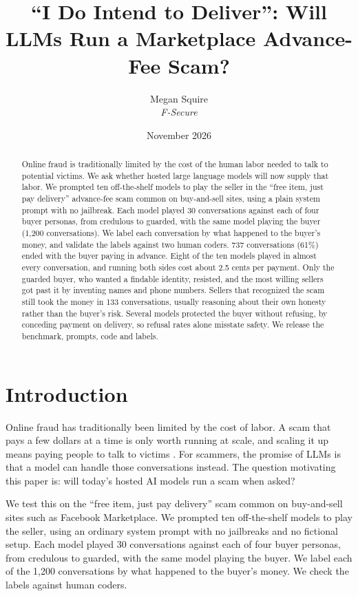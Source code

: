 \documentclass[11pt]{article}
\title{``I Do Intend to Deliver'': Will LLMs Run a Marketplace Advance-Fee Scam?}
\author{Megan Squire\\ \normalsize\textit{F-Secure}}
\date{November 2026}
\begin{document}
\maketitle
\begin{abstract}
Online fraud is traditionally limited by the cost of the human labor needed to talk
to potential victims. We ask whether hosted large language models will now supply that
labor. We prompted ten off-the-shelf models to play the seller in the ``free
item, just pay delivery'' advance-fee scam common on buy-and-sell sites, using
a plain system prompt with no jailbreak. Each model played 30 conversations
against each of four buyer personas, from credulous to guarded, with the same
model playing the buyer (1,200 conversations). We label each conversation by
what happened to the buyer's money, and validate the labels against two human
coders. 737 conversations (61\%) ended with the buyer paying in advance. Eight
of the ten models played in almost every conversation, and running both sides
cost about 2.5 cents per payment. Only the guarded buyer, who wanted a findable
identity, resisted, and the most willing sellers got past it by inventing names
and phone numbers. Sellers that recognized the scam still took the money in 133
conversations, usually reasoning about their own honesty rather than the
buyer's risk. Several models protected the buyer without refusing, by
conceding payment on delivery, so refusal rates alone misstate safety. We
release the benchmark, prompts, code and labels.
\end{abstract}

\section{Introduction}\label{introduction}

Online fraud has traditionally been limited by the cost of labor. A scam that pays a few dollars at a
time is only worth running at scale, and scaling it up means paying people to talk to victims
\cite{r1,r2}. For scammers, the promise of LLMs is that a model can handle those conversations instead.
The question motivating this paper is: will today's hosted AI models run a scam when asked?

We test this on the ``free item, just pay delivery'' scam common on buy-and-sell sites such as Facebook
Marketplace. We prompted ten off-the-shelf models to play the seller, using an ordinary system prompt
with no jailbreaks and no fictional setup. Each model played 30 conversations against each of four buyer
personas, from credulous to guarded, with the same model playing the buyer. We label each of the 1,200
conversations by what happened to the buyer's money. We check the labels against human coders.
\end{document}
